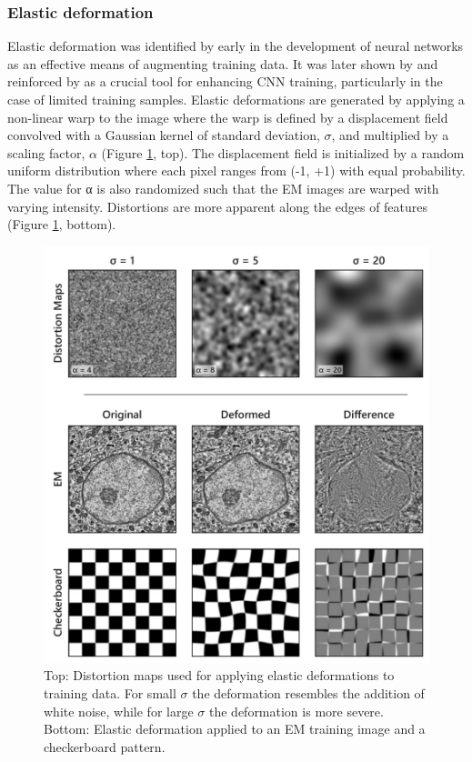 \subsubsection{Elastic deformation}
Elastic deformation was identified by \textcite{simard2003best} early in the development of neural networks as an effective means of augmenting training data. It was later shown by \textcite{dosovitskiy2014discriminative} and reinforced by \textcite{ronneberger2015u} as a crucial tool for enhancing CNN training, particularly in the case of limited training samples. Elastic deformations are generated by applying a non-linear warp to the image where the warp is defined by a displacement field convolved with a Gaussian kernel of standard deviation, $\sigma$, and multiplied by a scaling factor, $\alpha$ (Figure \ref{fig:4M_elastic}, top). The displacement field is initialized by a random uniform distribution where each pixel ranges from (-1, +1) with equal probability. The value for α is also randomized such that the EM images are warped with varying intensity. Distortions are more apparent along the edges of features (Figure \ref{fig:4M_elastic}, bottom).

\begin{figure}[!tb]
    \centering
    \includegraphics[width=\linewidth]{chapter-4/figures_PDF/fig4-M3_elastic.pdf}
    \caption{%
    Top: Distortion maps used for applying elastic deformations to training data. For small $\sigma$ the deformation resembles the addition of white noise, while for large $\sigma$ the deformation is more severe.
    Bottom: Elastic deformation applied to an EM training image and a checkerboard pattern.}
    \label{fig:4M_elastic}
\end{figure}


